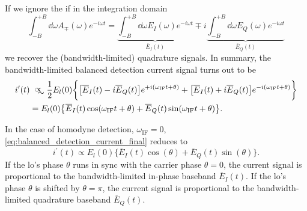 If we ignore the \gls{if} in the integration domain
\begin{equation}
    \int_{-B}^{+B}\dd{\omega}A_\mp(\omega)e^{-i\omega t}
    =
    \underbrace{\int_{-B}^{+B}\dd{\omega}E_I(\omega)e^{-i\omega t}}_{\overline{E}_I(t)}
    \mp
    i\underbrace{\int_{-B}^{+B}\dd{\omega}E_Q(\omega)e^{-i\omega t}}_{\overline{E}_Q(t)}
\end{equation}
we recover the (bandwidth-limited) quadrature signals.
In summary, the bandwidth-limited balanced detection current signal turns out to be
\begin{align}
    i^\prime(t)
    &\approxprop
    \frac{1}{2}E_l(0)
    \biggl\{
        \bigl[
            \overline{E}_I(t)-i\overline{E}_Q(t)
        \bigr]
        e^{+i(\omega_\text{IF}t+\theta)}
        +
        \bigl[
            \overline{E}_I(t)+i\overline{E}_Q(t)
        \bigr]
        e^{-i(\omega_\text{IF}t+\theta)}
    \biggr\}\\
    &=
    E_l(0)
    \bigl\{
        \overline{E}_I(t)\cos(\omega_\text{IF}t+\theta)
        +
        \overline{E}_Q(t)\sin(\omega_\text{IF}t+\theta)
    \bigr\}
    \label{eq:balanced_detection_current_final}.
\end{align}

In the case of homodyne detection, $\omega_\text{IF}=0$, \cref{eq:balanced_detection_current_final} reduces to
\begin{equation}
    i^\prime(t)
    \propto
    E_l(0)
    \bigl\{
        \overline{E}_I(t)\cos(\theta)
        +
        \overline{E}_Q(t)\sin(\theta)
    \bigr\}.
\end{equation}
If the \gls{lo}'s phase $\theta$ runs in sync with the carrier phase $\theta=0$, the current signal is proportional to the bandwidth-limited in-phase baseband $\overline{E}_I(t)$.
If the \gls{lo}'s phase $\theta$ is shifted by $\theta=\pi$, the current signal is proportional to the bandwidth-limited quadrature baseband $\overline{E}_Q(t)$.
